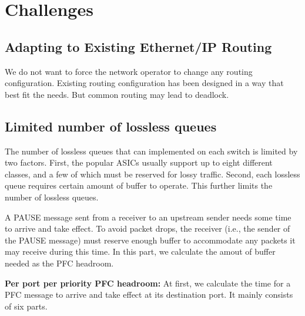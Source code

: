 \section{Challenges}\label{sec:challenges}

\subsection{Adapting to Existing Ethernet/IP Routing}

We do not want to force the network operator to change any routing configuration. 
Existing routing configuration has been designed in a way that 
best fit the needs. But common routing may lead to deadlock. 


\subsection{Limited number of lossless queues}\label{subsec:pfcheadroom}

The number of lossless queues that can implemented on each switch is limited by two factors. First, the popular ASICs usually support up to eight different classes,
and a few of which must be reserved for lossy traffic. Second, each lossless queue requires certain amount of buffer to operate. This further limits the number of
lossless queues. 


A PAUSE message sent from a receiver to an upstream sender needs some time to arrive and take effect. To avoid packet drops, the receiver (i.e., the sender of the PAUSE message) must reserve enough buffer to accommodate any packets it may receive during this time. In this part, we calculate the amout of buffer needed as the PFC headroom.

\textbf{Per port per priority PFC headroom:} At first, we calculate the time for a PFC message to arrive and take effect at its destination port. It mainly consists of six parts.

